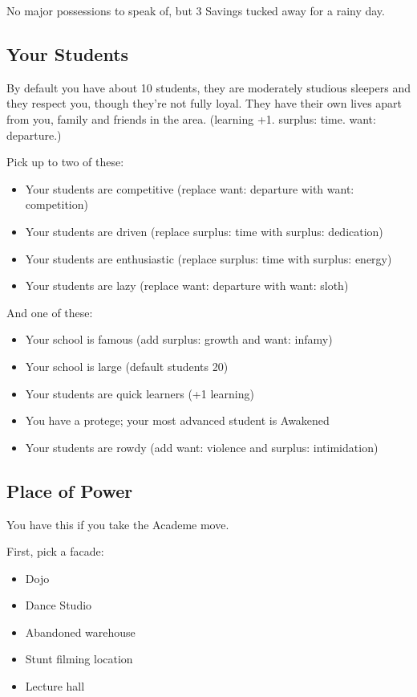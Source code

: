 \documentclass[10pt,twoside,openright]{memoir}
\begin{document}
No major possessions to speak of, but 3 Savings tucked away for a rainy
day.

\hypertarget{your-students}{%
\subsection{Your Students}\label{your-students}}

By default you have about 10 students, they are moderately studious
sleepers and they respect you, though they're not fully loyal. They have
their own lives apart from you, family and friends in the area.
(learning +1. surplus: time. want: departure.)

Pick up to two of these:

\begin{itemize}
\tightlist
\item
  Your students are competitive (replace want: departure with want:
  competition)
\item
  Your students are driven (replace surplus: time with surplus:
  dedication)
\item
  Your students are enthusiastic (replace surplus: time with surplus:
  energy)
\item
  Your students are lazy (replace want: departure with want: sloth)
\end{itemize}

And one of these:

\begin{itemize}
\tightlist
\item
  Your school is famous (add surplus: growth and want: infamy)
\item
  Your school is large (default students 20)
\item
  Your students are quick learners (+1 learning)
\item
  You have a protege; your most advanced student is Awakened
\item
  Your students are rowdy (add want: violence and surplus: intimidation)
\end{itemize}

\hypertarget{place-of-power-1}{%
\subsection{Place of Power}\label{place-of-power-1}}

You have this if you take the Academe move.

First, pick a facade:

\begin{itemize}
\tightlist
\item
  Dojo
\item
  Dance Studio
\item
  Abandoned warehouse
\item
  Stunt filming location
\item
  Lecture hall
\end{itemize}
\end{document}
